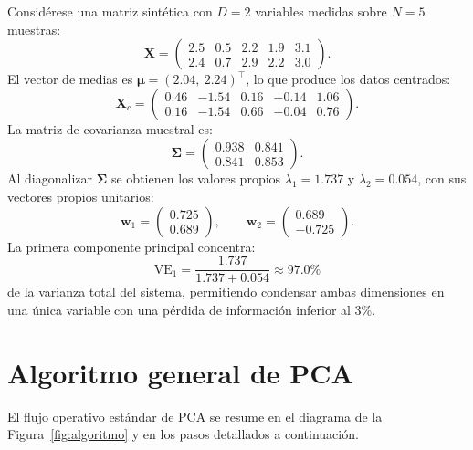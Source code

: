 \documentclass[11pt,letterpaper]{article}
\begin{document}
	Considérese una matriz sintética con $D=2$ variables medidas sobre $N=5$ muestras:
	\[
	\mathbf{X} = \begin{pmatrix} 2.5 & 0.5 & 2.2 & 1.9 & 3.1 \\ 2.4 & 0.7 & 2.9 & 2.2 & 3.0 \end{pmatrix}.
	\]
	El vector de medias es $\boldsymbol{\mu} = (2.04,\ 2.24)^{\top}$, lo que produce los datos centrados:
	\[
	\mathbf{X}_c = \begin{pmatrix} 0.46 & -1.54 & 0.16 & -0.14 & 1.06 \\ 0.16 & -1.54 & 0.66 & -0.04 & 0.76 \end{pmatrix}.
	\]
	La matriz de covarianza muestral es:
	\[
	\boldsymbol{\Sigma} = \begin{pmatrix} 0.938 & 0.841 \\ 0.841 & 0.853 \end{pmatrix}.
	\]
	Al diagonalizar $\boldsymbol{\Sigma}$ se obtienen los valores propios $\lambda_1 = 1.737$ y $\lambda_2 = 0.054$, con sus vectores propios unitarios:
	\[
	\mathbf{w}_1 = \begin{pmatrix} 0.725 \\ 0.689 \end{pmatrix}, \qquad \mathbf{w}_2 = \begin{pmatrix} 0.689 \\ -0.725 \end{pmatrix}.
	\]
	La primera componente principal concentra:
	\[
	\mathrm{VE}_1 = \frac{1.737}{1.737 + 0.054} \approx 97.0\%
	\]
	de la varianza total del sistema, permitiendo condensar ambas dimensiones en una única variable con una pérdida de información inferior al 3\%.
	
	\newpage
	
	\section{Algoritmo general de PCA}
	
	El flujo operativo estándar de PCA se resume en el diagrama de la Figura~\ref{fig:algoritmo} y en los pasos detallados a continuación.
	
\end{document}
